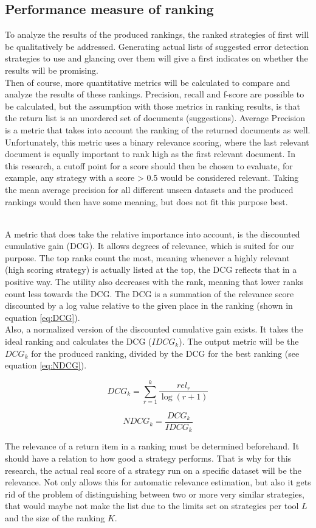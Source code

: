 \subsection{Performance measure of ranking}
To analyze the results of the produced rankings, the ranked strategies of first will be qualitatively be addressed. Generating actual lists of suggested error detection strategies to use and glancing over them will give a first indicates on whether the results will be promising.
\\Then of course, more quantitative metrics will be calculated to compare and analyze the results of these rankings. Precision, recall and f-score are possible to be calculated, but the assumption with those metrics in ranking results, is that the return list is an unordered set of documents (suggestions).
Average Precision is a metric that takes into account the ranking of the returned documents as well. Unfortunately, this metric uses a binary relevance scoring, where the last relevant document is equally important to rank high as the first relevant document. In this research, a cutoff point for a score should then be chosen to evaluate, for example, any strategy with a score > 0.5 would be considered relevant. Taking the mean average precision for all different unseen datasets and the produced rankings would then have some meaning, but does not fit this purpose best.

~\\A metric that does take the relative importance into account, is the discounted cumulative gain (DCG). It allows degrees of relevance, which is suited for our purpose. The top ranks count the most, meaning whenever a highly relevant (high scoring strategy) is actually listed at the top, the DCG reflects that in a positive way. The utility also decreases with the rank, meaning that lower ranks count less towards the DCG. The DCG is a summation of the relevance score discounted by a log value relative to the given place in the ranking (shown in equation \ref{eq:DCG}).
~\\Also, a normalized version of the discounted cumulative gain exists. It takes the ideal ranking and calculates the DCG ($IDCG_k$). The output metric will be the $DCG_k$ for the produced ranking, divided by the DCG for the best ranking (see equation \ref{eq:NDCG}). 

\begin{equation}
\label{eq:DCG}
    DCG_k = \sum^k_{r=1} \frac{rel_r}{\log(r+1)}
\end{equation}

\begin{equation}
\label{eq:NDCG}
    NDCG_k = \frac{DCG_k}{IDCG_k}
\end{equation}

The relevance of a return item in a ranking must be determined beforehand. It should have a relation to how good a strategy performs. 
That is why for this research, the actual real score of a strategy run on a specific dataset will be the relevance. Not only allows this for automatic relevance estimation, but also it gets rid of the problem of distinguishing between two or more very similar strategies, that would maybe not make the list due to the limits set on strategies per tool $L$ and the size of the ranking $K$.

